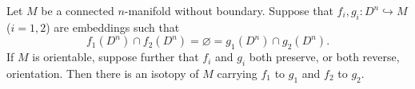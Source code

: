 Let $M$ be a connected $n$-manifold without boundary. Suppose that $f_i, g_i: D^n \hookrightarrow M$ ($i = 1, 2$) are embeddings such that
$$
f_1(D^n) \cap f_2(D^n) = \varnothing = g_1(D^n) \cap g_2(D^n).
$$
If $M$ is orientable, suppose further that $f_i$ and $g_i$ both preserve, or both reverse, orientation. Then there is an isotopy of $M$ carrying $f_1$ to $g_1$ and $f_2$ to $g_2$.
